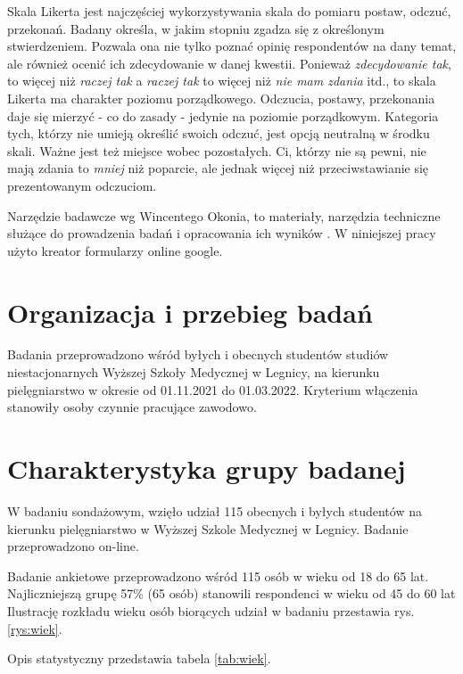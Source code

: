 \documentclass[a4paper,12pt,twoside,openright]{mwrep}
\begin{document}
Skala Likerta jest najczęściej wykorzystywania skala do pomiaru postaw, odczuć, przekonań. Badany określa, w jakim stopniu zgadza się z określonym stwierdzeniem. Pozwala ona nie tylko poznać opinię respondentów na dany temat, ale również ocenić ich zdecydowanie w danej kwestii. Ponieważ \textit{zdecydowanie tak}, to więcej niż \textit{raczej tak} a \textit{raczej tak} to więcej niż \textit{nie mam zdania} itd., to skala Likerta ma charakter poziomu porządkowego. Odczucia, postawy, przekonania daje się mierzyć - co do zasady - jedynie na poziomie porządkowym. Kategoria tych, którzy nie umieją określić swoich odczuć, jest opcją neutralną w środku skali. Ważne jest też miejsce wobec pozostałych. Ci, którzy nie są pewni, nie mają zdania to \textit{mniej} niż poparcie, ale jednak więcej niż przeciwstawianie się prezentowanym odczuciom.

Narzędzie badawcze wg Wincentego Okonia, to materiały, narzędzia techniczne służące do prowadzenia badań i opracowania ich wyników \cite{winc}. W niniejszej pracy użyto kreator formularzy online google.


\section{Organizacja i przebieg badań}
Badania przeprowadzono wśród byłych i obecnych studentów studiów niestacjonarnych Wyższej Szkoły Medycznej w Legnicy, na kierunku pielęgniarstwo w okresie od 01.11.2021 do 01.03.2022. Kryterium włączenia stanowiły osoby czynnie pracujące zawodowo. 


\section{Charakterystyka grupy badanej}


W badaniu sondażowym, wzięło udział 115 obecnych i byłych studentów na kierunku pielęgniarstwo w Wyższej Szkole Medycznej w Legnicy. Badanie przeprowadzono on-line.



Badanie ankietowe przeprowadzono wśród 115 osób w wieku od 18 do 65 lat. Najliczniejszą grupę 57\%  (65 osób) stanowili respondenci w wieku od 45 do 60 lat 
Ilustrację rozkładu wieku osób biorących udział w badaniu przestawia rys. \ref{rys:wiek}.

Opis statystyczny przedstawia tabela \ref{tab:wiek}.
\end{document}

